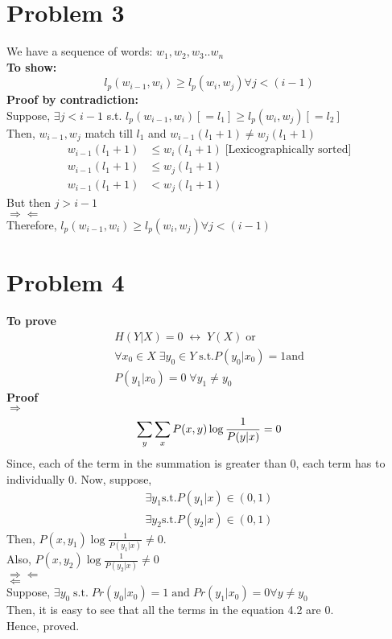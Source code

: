 \documentclass[paper=a4, fontsize=11pt]{scrartcl} %
\numberwithin{equation}{section} %
\numberwithin{figure}{section} %
\numberwithin{table}{section} %
\begin{document}
\section{Problem 3}
We have a sequence of words: $w_1, w_2, w_3 .. w_n$\\
\textbf{To show: }\\
\begin{equation}
	l_p(w_{i-1}, w_i) \geq l_p(w_i, w_j) \forall j<(i-1)
\end{equation}
\textbf{Proof by contradiction: }\\
Suppose, $\exists j<i-1$ s.t. $l_p(w_{i-1}, w_i)[=l_1] \geq l_p(w_i, w_j) [=l_2]$\\
Then, $w_{i-1}, w_j$ match till $l_1$ and $w_{i-1}(l_1+1) \neq w_j(l_1+1)$\\
\begin{align*}
w_{i-1}(l_1+1) & \leq w_i(l_1+1)\; \text{[Lexicographically sorted]}\\
w_{i-1}(l_1+1) & \leq w_j(l_1+1)\\
w_{i-1}(l_1+1) & < w_j(l_1+1)
\end{align*}
But then $j> i-1$\\
$\Rightarrow\Leftarrow$\\
Therefore, 
	$l_p(w_{i-1}, w_i) \geq l_p(w_i, w_j) \forall j<(i-1)$
\section{Problem 4}	
\textbf{To prove}\\
\begin{align*}
H(Y|X)=0\;\leftrightarrow \;Y(X)\;\text{or}
\\\forall x_0\in X\;\exists y_0 \in Y \; \text{s.t.} P(y_0|x_0)= 1 \text{and} \\
P(y_1|x_0)=0\;\forall y_1 \neq y_0
\end{align*}
\textbf{Proof}\\
$\Rightarrow$
\begin{equation}
\sum_y\sum_x P(x,y)\log \frac{1}{P(y|x)} = 0\\
\end{equation}
Since, each of the term in the summation is greater than 0, each term has to individually 0. Now, suppose,
\begin{align*}
	\exists y_1 \text{s.t.} P(y_1|x)\in(0,1)\\
	\exists y_2 \text{s.t.} P(y_2|x)\in(0,1)
\end{align*}
Then, $P(x,y_1)\log \frac{1}{P(y_1|x)} \neq 0$.\\ Also, $P(x,y_2)\log \frac{1}{P(y_2|x)} \neq 0$\\
$\Rightarrow\Leftarrow$\\
$\Leftarrow$\\
Suppose, $\exists y_0\; \text{s.t.}\; Pr(y_0|x_0)=1\; \text{and}\; Pr(y_1|x_0)=0\forall y\neq y_0$\\
Then, it is easy to see that all the terms in the equation 4.2 are 0.\\
Hence, proved. 
\end{document}

